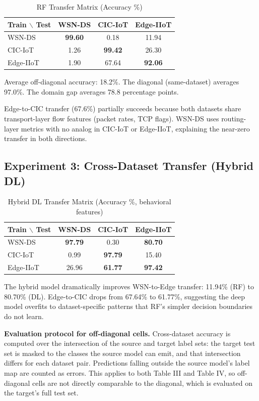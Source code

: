 \documentclass[conference]{IEEEtran}
\begin{document}
\begin{table}[h]
\centering
\caption{RF Transfer Matrix (Accuracy \%)}
\label{tab:rf-transfer}
\begin{tabular}{lccc}
\toprule
\textbf{Train $\backslash$ Test} & \textbf{WSN-DS} & \textbf{CIC-IoT} & \textbf{Edge-IIoT} \\
\midrule
WSN-DS & \textbf{99.60} & 0.18 & 11.94 \\
CIC-IoT & 1.26 & \textbf{99.42} & 26.30 \\
Edge-IIoT & 1.90 & 67.64 & \textbf{92.06} \\
\bottomrule
\end{tabular}
\end{table}

Average off-diagonal accuracy: 18.2\%. The diagonal (same-dataset) averages 97.0\%. The domain gap averages 78.8 percentage points.

Edge-to-CIC transfer (67.6\%) partially succeeds because both datasets share transport-layer flow features (packet rates, TCP flags). WSN-DS uses routing-layer metrics with no analog in CIC-IoT or Edge-IIoT, explaining the near-zero transfer in both directions.

\subsection{Experiment 3: Cross-Dataset Transfer (Hybrid DL)}

\begin{table}[h]
\centering
\caption{Hybrid DL Transfer Matrix (Accuracy \%, behavioral features)}
\label{tab:hybrid-transfer}
\begin{tabular}{lccc}
\toprule
\textbf{Train $\backslash$ Test} & \textbf{WSN-DS} & \textbf{CIC-IoT} & \textbf{Edge-IIoT} \\
\midrule
WSN-DS & \textbf{97.79} & 0.30 & \textbf{80.70} \\
CIC-IoT & 0.99 & \textbf{97.79} & 15.40 \\
Edge-IIoT & 26.96 & \textbf{61.77} & \textbf{97.42} \\
\bottomrule
\end{tabular}
\end{table}

The hybrid model dramatically improves WSN-to-Edge transfer: 11.94\% (RF) to 80.70\% (DL). Edge-to-CIC drops from 67.64\% to 61.77\%, suggesting the deep model overfits to dataset-specific patterns that RF's simpler decision boundaries do not learn.

\textbf{Evaluation protocol for off-diagonal cells.} Cross-dataset accuracy is computed over the intersection of the source and target label sets: the target test set is masked to the classes the source model can emit, and that intersection differs for each dataset pair. Predictions falling outside the source model's label map are counted as errors. This applies to both Table III and Table IV, so off-diagonal cells are not directly comparable to the diagonal, which is evaluated on the target's full test set.
\end{document}

